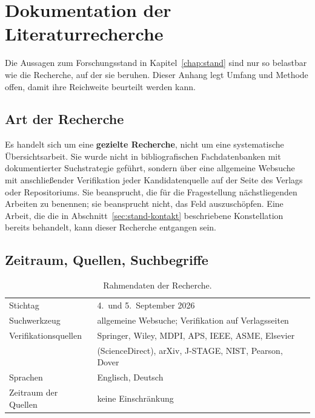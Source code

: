 \documentclass[12pt,a4paper]{report}
\begin{document}

\chapter{Dokumentation der Literaturrecherche}
\label{app:recherche}

Die Aussagen zum Forschungsstand in Kapitel~\ref{chap:stand} sind nur so
belastbar wie die Recherche, auf der sie beruhen. Dieser Anhang legt
Umfang und Methode offen, damit ihre Reichweite beurteilt werden kann.

\section{Art der Recherche}

Es handelt sich um eine \textbf{gezielte Recherche}, nicht um eine
systematische Übersichtsarbeit. Sie wurde nicht in bibliografischen
Fachdatenbanken mit dokumentierter Suchstrategie geführt, sondern über
eine allgemeine Websuche mit anschließender Verifikation jeder
Kandidatenquelle auf der Seite des Verlags oder Repositoriums. Sie
beansprucht, die für die Fragestellung nächstliegenden Arbeiten zu
benennen; sie beansprucht nicht, das Feld auszuschöpfen. Eine Arbeit,
die die in Abschnitt~\ref{sec:stand-kontakt} beschriebene Konstellation
bereits behandelt, kann dieser Recherche entgangen sein.

\section{Zeitraum, Quellen, Suchbegriffe}

\begin{table}[htbp]
  \centering
  \begin{tabular}{ll}
    \hline
    Stichtag & 4.\ und 5.\ September 2026 \\
    Suchwerkzeug & allgemeine Websuche; Verifikation auf Verlagsseiten \\
    Verifikationsquellen & Springer, Wiley, MDPI, APS, IEEE, ASME, Elsevier \\
                         & (ScienceDirect), arXiv, J-STAGE, NIST, Pearson, Dover \\
    Sprachen & Englisch, Deutsch \\
    Zeitraum der Quellen & keine Einschränkung \\
    \hline
  \end{tabular}
  \caption{Rahmendaten der Recherche.}
\end{table}
\end{document}
